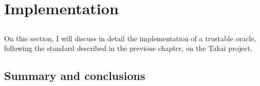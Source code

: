 \chapter{Implementation}\label{chap:chap4}

\section*{}

On this section, I will discuss in detail the implementation of a trustable oracle, following the standard described in the previous chapter, on the Takai project.

\section{Summary and conclusions}
